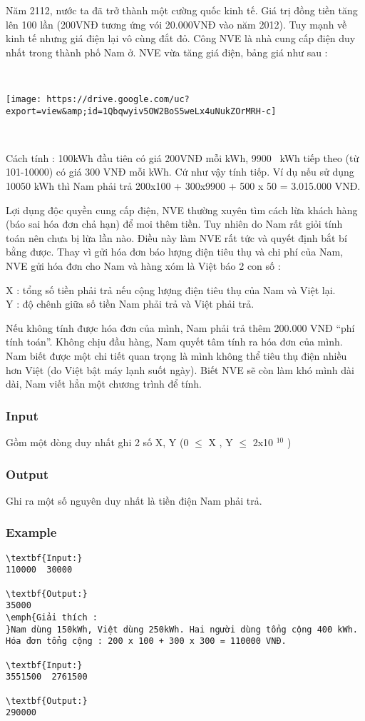 

Năm 2112, nước ta đã trở thành một cường quốc kinh tế. Giá trị đồng tiền tăng lên 100 lần (200VNĐ tương ứng vói 20.000VNĐ vào năm 2012). Tuy mạnh về kinh tế nhưng giá điện lại vô cùng đắt đỏ. Công NVE là nhà cung cấp điện duy nhất trong thành phố Nam ở. NVE vừa tăng giá điện, bảng giá như sau :

 


\texttt{[image: https://drive.google.com/uc?export=view\&amp;id=1Qbqwyiv5OW2BoS5weLx4uNukZOrMRH-c]}

 

Cách tính : 100kWh đầu tiên có giá 200VNĐ mỗi kWh, 9900  kWh tiếp theo (từ 101-10000) có giá 300 VNĐ mỗi kWh. Cứ như vậy tính tiếp. Ví dụ nếu sử dụng 10050 kWh thì Nam phải trả 200x100 + 300x9900 + 500 x 50 = 3.015.000 VNĐ.

Lợi dụng độc quyền cung cấp điện, NVE thường xuyên tìm cách lừa khách hàng (báo sai hóa đơn chả hạn) để moi thêm tiền. Tuy nhiên do Nam rất giỏi tính toán nên chưa bị lừa lần nào. Điều này làm NVE rất tức và quyết định bắt bí bằng được. Thay vì gửi hóa đơn báo lượng điện tiêu thụ và chi phí của Nam, NVE gửi hóa đơn cho Nam và hàng xóm là Việt báo 2 con số :

X : tổng số tiền phải trả nếu cộng lượng điện tiêu thụ của Nam và Việt lại.
\\Y : độ chênh giữa số tiền Nam phải trả và Việt phải trả.

Nếu không tính được hóa đơn của mình, Nam phải trả thêm 200.000 VNĐ “phí tính toán”. Không chịu đầu hàng, Nam quyết tâm tính ra hóa đơn của mình. Nam biết được một chi tiết quan trọng là mình không thể tiêu thụ điện nhiều hơn Việt (do Việt bật máy lạnh suốt ngày). Biết NVE sẽ còn làm khó mình dài dài, Nam viết hẳn một chương trình để tính.

\subsubsection{Input}

Gồm một dòng duy nhất ghi 2 số X, Y (0  $\le$  X , Y $\le$  2x10 $^ 10 $ )

\subsubsection{Output}

Ghi ra một số nguyên duy nhất là tiền điện Nam phải trả.

\subsubsection{Example}
\begin{verbatim}
\textbf{Input:}
110000  30000

\textbf{Output:}
35000
\emph{Giải thích : 
}Nam dùng 150kWh, Việt dùng 250kWh. Hai người dùng tổng cộng 400 kWh. 
Hóa đơn tổng cộng : 200 x 100 + 300 x 300 = 110000 VNĐ.

\textbf{Input:}
3551500  2761500

\textbf{Output:}
290000

\end{verbatim}

\emph{ }
